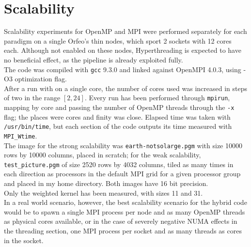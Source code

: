 \documentclass[a4paper, 11pt]{article}
\begin{document}
\section{Scalability}
Scalability experiments for OpenMP and MPI were performed separately for each paradigm on a single Orfeo's thin nodes, which sport 2 sockets with 12 cores each. Although not enabled on these nodes, Hyperthreading is expected to have no beneficial effect, as the pipeline is already exploited fully.\\
The code was compiled with \texttt{gcc} 9.3.0 and linked against OpenMPI 4.0.3, using -O3 optimization flag.\\
After a run with on a single core, the number of cores used was increased in steps of two in the range $[2, 24]$. Every run has been performed through \texttt{mpirun}, mapping by core and passing the number of OpenMP threads through the \texttt{-x} flag; the places were cores and finity was close. Elapsed time was taken with \texttt{/usr/bin/time}, but each section of the code outputs its time measured with \texttt{MPI\_Wtime}.\\
The image for the strong scalability was \texttt{earth-notsolarge.pgm} with size 10000 rows by 10000 columns, placed in scratch; for the weak scalability, \texttt{test\_picture.pgm} of size 2520 rows by 4032 columns, tiled as many times in each direction as processors in the default MPI grid for a given processor group and placed in my home directory. Both images have 16 bit precision.\\
Only the weighted kernel has been measured, with sizes 11 and 31.\\
In a real world scenario, however, the best scalability scenario for the hybrid code would be to spawn a single MPI process per node and as many OpenMP threads as physical cores available, or in the case of severely negative NUMA effects in the threading section, one MPI process per socket and as many threads as cores in the socket. 
\end{document}
